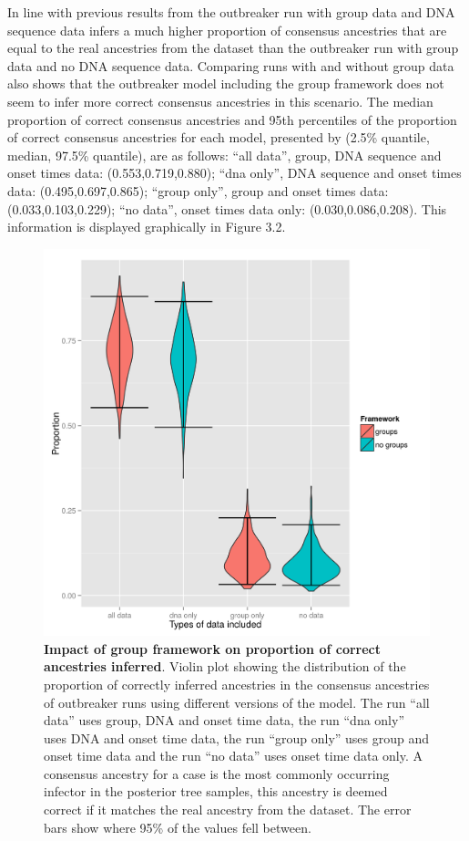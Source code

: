 \documentclass[11pt,a4paper]{report}
\begin{document}
In line with previous results from \citet{outbrkr} the outbreaker run with group data and DNA sequence data infers a much higher proportion of consensus ancestries that are equal to the real ancestries from the dataset than the outbreaker run with group data and no DNA sequence data. Comparing runs with and without group data also shows that the outbreaker model including the group framework does not seem to infer more correct consensus ancestries in this scenario. The median proportion of correct consensus ancestries and 95th percentiles of the proportion of correct consensus ancestries for each model, presented by (2.5\% quantile, median, 97.5\% quantile), are as follows: ``all data'', group, DNA sequence and onset times data: (0.553,0.719,0.880); ``dna only'', DNA sequence and onset times data: (0.495,0.697,0.865); ``group only'', group and onset times data: (0.033,0.103,0.229); ``no data'', onset times data only: (0.030,0.086,0.208). This information is displayed graphically in Figure 3.2.
\begin{figure}
\centering
\includegraphics[scale=0.9]{final.png}
\newline
\caption{{\bf Impact of group framework on proportion of correct ancestries inferred}. Violin plot showing the distribution of the proportion of correctly inferred ancestries in the consensus ancestries of outbreaker runs using different versions of the model. The run ``all data'' uses group, DNA and onset time data, the run ``dna only'' uses DNA and onset time data, the run ``group only'' uses group and onset time data and the run ``no data'' uses onset time data only. A consensus ancestry for a case is the most commonly occurring infector in the posterior tree samples, this ancestry is deemed correct if it matches the real ancestry from the dataset. The error bars show where 95\% of the values fell between.}

\end{figure}
\end{document}
